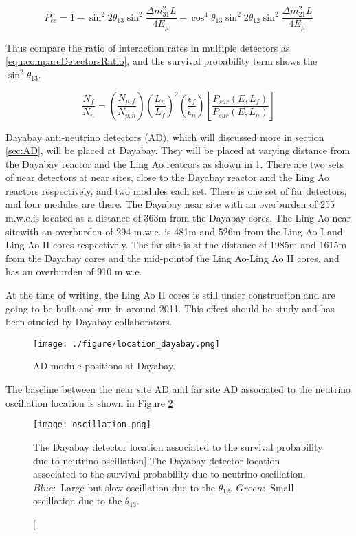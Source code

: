 \begin{equation}
\label{equ:survivalProb}
P_{ee} = 1 - \sin^{2}{2\theta_{13}}\sin^{2}{\frac{{\Delta}m^{2}_{31}L}{4E_{\mu}}} - \cos^{4}{\theta_{13}}\sin^{2}{2\theta_{12}}\sin^{2}{\frac{{\Delta}m^{2}_{21}L}{4E_{\mu}}}
\end{equation}


Thus compare the ratio of interaction rates in multiple detectors as \ref{equ:compareDetectorsRatio}, and
the survival probability term shows the $\sin^{2}{\theta_{13}}$.


\begin{equation}
\label{equ:compareDetectorsRatio}
\frac{N_{f}}{N_{n}} = (\frac{N_{p,f}}{N_{p,n}})(\frac{L_n}{L_f})^{2}(\frac{\epsilon_f}{\epsilon_n})[\frac{P_{sur}(E,L_f)}{P_{sur}(E,L_n)}]
\end{equation}


Dayabay anti-neutrino detectors (AD), which will discussed more in section \ref{sec:AD},
will be placed at Dayabay. They will be placed at varying distance from the Dayabay reactor and
the Ling Ao reatcors as shown in \ref{fig:location_dayabay.png}. There are two sets of near detectors
at near sites, close to the Dayabay reactor and the Ling Ao reactors respectively, and two modules each set.
There is one set of far detectors, and four modules are there. The Dayabay near site with an overburden of
255 m.w.e.is located at a distance of 363m from the Dayabay cores. The Ling Ao near sitewith an overburden of
294 m.w.e. is 481m and 526m from the Ling Ao I and Ling Ao II cores respectively. The far site is at the distance
of 1985m and 1615m from the Dayabay cores and the mid-pointof the Ling Ao-Ling Ao II cores, and has an overburden
of 910 m.w.e.

At the time of writing, the Ling Ao II cores is still under construction and are going to be built and run in around
2011. This effect should be study and has been studied by Dayabay collaborators.


\begin{figure}
    \centering
    \texttt{[image: ./figure/location\_dayabay.png]}
    \caption{AD module positions at Dayabay.}
    \label{fig:location_dayabay.png}
    \end{figure}


The baseline between the near site AD and far site AD associated to the neutrino oscillation
location is shown in Figure \ref{fig:oscillation}


\begin{figure}
    \label{fig:oscillation}
    \centering
    \texttt{[image: oscillation.png]}
    \caption
    [The Dayabay detector location associated to the survival probability due to neutrino oscillation]
    {The Dayabay detector location associated to the survival probability due to neutrino oscillation.
$Blue:$ Large but slow oscillation due to the $\theta_{12}$. $Green:$ Small oscillation due to the $\theta_{13}$.}
    \end{figure}




